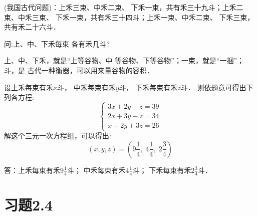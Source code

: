 \begin{example}
(我国古代问题)：上禾三束、中禾二束、
下禾一束，共有禾三十九斗；上禾二束、中禾三束、
下禾一束，共有禾三十四斗；上禾一束、中禾二束、
下禾三束，共有禾二十六斗．

问:上、中、下禾每束
各有禾几斗?
\end{example}

\begin{note}
    上、中、下禾，就是“上等谷物、中
    等谷物、下等谷物”；一束，就是“一捆”；斗，是
    古代一种衡器，可以用来量谷物的容积．
\end{note}

\begin{solution}
    设上禾每束有禾$x$斗，
    中禾每束有禾$y$斗，
    下禾每束有禾$z$斗．
    则依题意可得出下列各方程:
\[\begin{cases}
    3x+2y+z=39\\
    2x+3y+z=34\\
    x+2y+3z=26
\end{cases}\] 
解这个三元一次方程组，可以得出:
\[ (x,y,z)=\left(9\frac{1}{4},\; 4\frac{1}{4},\; 2\frac{3}{4}\right)\]

答：上禾每束有禾$9\frac{1}{4}$斗；
中禾每束有禾$4\frac{1}{4}$斗；
下禾每束有禾$2\frac{3}{4}$斗．
\end{solution}



\section*{习题2.4}

